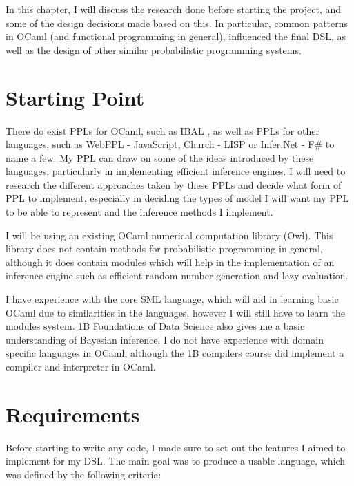 
In this chapter, I will discuss the research done before starting the project, and some of the design decisions made based on this. In particular, common patterns in OCaml (and functional programming in general), influenced the final DSL, as well as the design of other similar probabilistic programming systems.

\section{Starting Point}

There do exist PPLs for OCaml, such as IBAL \cite{kiselyov2009embedded}, as well as PPLs for other languages, such as WebPPL - JavaScript\cite{mobus2018structure}, Church - LISP\cite{goodman2012church} or Infer.Net - F\#\cite{wang2011using} to name a few. My PPL can draw on some of the ideas introduced by these languages, particularly in implementing efficient inference engines. I will need to research the different approaches taken by these PPLs and decide what form of PPL to implement, especially in deciding the types of model I will want my PPL to be able to represent and the inference methods I implement.

I will be using an existing OCaml numerical computation library (Owl). This library does not contain methods for probabilistic programming in general, although it does contain modules which will help in the implementation of an inference engine such as efficient random number generation and lazy evaluation.

I have experience with the core SML language, which will aid in learning basic OCaml due to similarities in the languages, however I will still have to learn the modules system. 1B Foundations of Data Science also gives me a basic understanding of Bayesian inference. I do not have experience with domain specific languages in OCaml, although the 1B compilers course did implement a compiler and interpreter in OCaml.

\section{Requirements}

Before starting to write any code, I made sure to set out the features I aimed to implement for my DSL. The main goal was to produce a usable language, which was defined by the following criteria:

